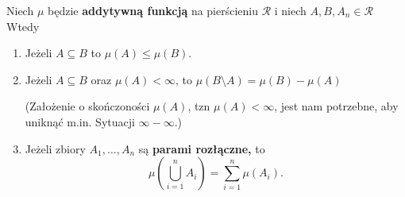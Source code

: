 \begin{lemma}
	Niech $\mu $ będzie \textbf{addytywną funkcją } na pierścieniu $\mathcal{R}$ i niech $A,B, A_{n} \in  \mathcal{R}$ 
	Wtedy
	\begin{enumerate}[label=\alph*)]
		\item Jeżeli $A\subseteq B$ to $\mu \left( A \right) \le \mu\left( B \right) $.
		\item Jeżeli $A\subseteq B$ oraz $\mu \left( A \right) < \infty$, to $\mu \left( B\setminus A \right) = \mu\left( B \right) - \mu \left( A \right) $ 

			(Założenie o skończoności $\mu\left( A \right) $, tzn $\mu\left( A \right) < \infty$, jest nam potrzebne, aby uniknąć m.in. Sytuacji $\infty - \infty$.)
		\item Jeżeli zbiory $A_1,\ldots, A_{n}$ są \textbf{parami rozłączne,} to
			\[
			\mu \left(\bigcup_{i=1} ^{n} A_{i} \right)= \sum_{i=1}^{n} \mu \left( A_{i} \right)  
			.\] 
	\end{enumerate}
\end{lemma} 
